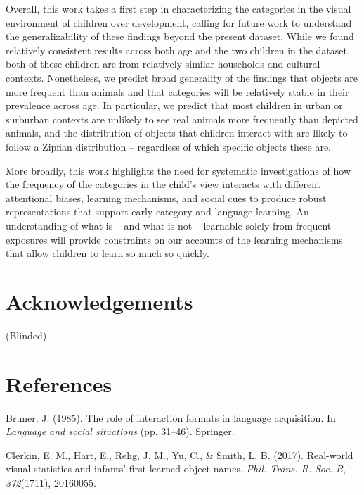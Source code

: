 \documentclass[10pt, letterpaper]{article}
\begin{document}
Overall, this work takes a first step in characterizing the categories
in the visual environment of children over development, calling for
future work to understand the generalizability of these findings beyond
the present dataset. While we found relatively consistent results across
both age and the two children in the dataset, both of these children are
from relatively similar households and cultural contexts. Nonetheless,
we predict broad generality of the findings that objects are more
frequent than animals and that categories will be relatively stable in
their prevalence across age. In particular, we predict that most
children in urban or surburban contexts are unlikely to see real animals
more frequently than depicted animals, and the distribution of objects
that children interact with are likely to follow a Zipfian distribution
-- regardless of which specific objects these are.

More broadly, this work highlights the need for systematic
investigations of how the frequency of the categories in the child's
view interacts with different attentional biases, learning mechanisms,
and social cues to produce robust representations that support early
category and language learning. An understanding of what is -- and what
is not -- learnable solely from frequent exposures will provide
constraints on our accounts of the learning mechanisms that allow
children to learn so much so quickly.

\hypertarget{acknowledgements}{%
\section{Acknowledgements}\label{acknowledgements}}

(Blinded)

\hypertarget{references}{%
\section{References}\label{references}}

\setlength{\parindent}{-0.1in}
\setlength{\leftskip}{0.125in}

\noindent

\hypertarget{refs}{}
\leavevmode\hypertarget{ref-bruner1985role}{}%
Bruner, J. (1985). The role of interaction formats in language
acquisition. In \emph{Language and social situations} (pp. 31--46).
Springer.

\leavevmode\hypertarget{ref-clerkin2017}{}%
Clerkin, E. M., Hart, E., Rehg, J. M., Yu, C., \& Smith, L. B. (2017).
Real-world visual statistics and infants' first-learned object names.
\emph{Phil. Trans. R. Soc. B}, \emph{372}(1711), 20160055.
\end{document}
